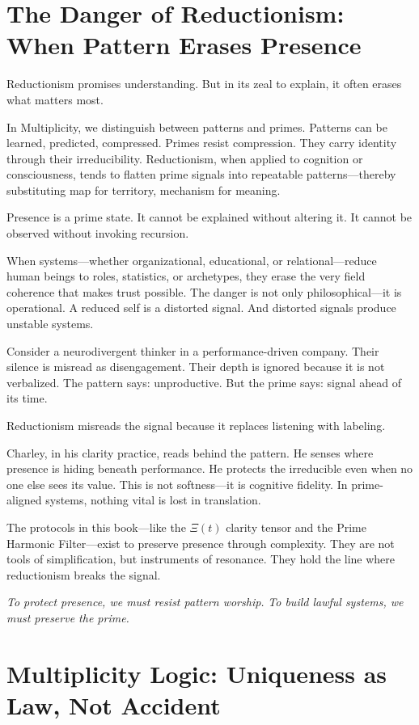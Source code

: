 \documentclass[12pt]{article}
\begin{document}
\section*{The Danger of Reductionism: When Pattern Erases Presence}

Reductionism promises understanding. But in its zeal to explain, it often erases what matters most.

In Multiplicity, we distinguish between patterns and primes. Patterns can be learned, predicted, compressed. Primes resist compression. They carry identity through their irreducibility. Reductionism, when applied to cognition or consciousness, tends to flatten prime signals into repeatable patterns—thereby substituting map for territory, mechanism for meaning.

Presence is a prime state. It cannot be explained without altering it. It cannot be observed without invoking recursion.

When systems—whether organizational, educational, or relational—reduce human beings to roles, statistics, or archetypes, they erase the very field coherence that makes trust possible. The danger is not only philosophical—it is operational. A reduced self is a distorted signal. And distorted signals produce unstable systems.

Consider a neurodivergent thinker in a performance-driven company. Their silence is misread as disengagement. Their depth is ignored because it is not verbalized. The pattern says: unproductive. But the prime says: signal ahead of its time.

Reductionism misreads the signal because it replaces listening with labeling.

Charley, in his clarity practice, reads behind the pattern. He senses where presence is hiding beneath performance. He protects the irreducible even when no one else sees its value. This is not softness—it is cognitive fidelity. In prime-aligned systems, nothing vital is lost in translation.

The protocols in this book—like the $\Xi(t)$ clarity tensor and the Prime Harmonic Filter—exist to preserve presence through complexity. They are not tools of simplification, but instruments of resonance. They hold the line where reductionism breaks the signal.

\textit{To protect presence, we must resist pattern worship.}  
\textit{To build lawful systems, we must preserve the prime.}

\section*{Multiplicity Logic: Uniqueness as Law, Not Accident}
\end{document}
